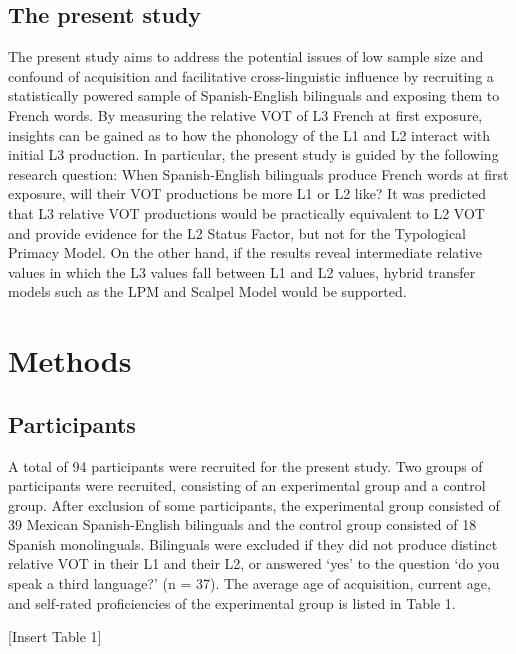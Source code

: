 \documentclass[
  english,
  man]{apa6}
\begin{document}
\hypertarget{the-present-study}{%
\subsection{The present study}\label{the-present-study}}

The present study aims to address the potential issues of low sample size and confound of acquisition and facilitative cross-linguistic influence by recruiting a statistically powered sample of Spanish-English bilinguals and exposing them to French words.
By measuring the relative VOT of L3 French at first exposure, insights can be gained as to how the phonology of the L1 and L2 interact with initial L3 production.
In particular, the present study is guided by the following research question: When Spanish-English bilinguals produce French words at first exposure, will their VOT productions be more L1 or L2 like?
It was predicted that L3 relative VOT productions would be practically equivalent to L2 VOT and provide evidence for the L2 Status Factor, but not for the Typological Primacy Model.
On the other hand, if the results reveal intermediate relative values in which the L3 values fall between L1 and L2 values, hybrid transfer models such as the LPM and Scalpel Model would be supported.

\hypertarget{methods}{%
\section{Methods}\label{methods}}

\hypertarget{participants}{%
\subsection{Participants}\label{participants}}

A total of 94 participants were recruited for the present study.
Two groups of participants were recruited, consisting of an experimental group and a control group. After exclusion of some participants, the experimental group consisted of 39 Mexican Spanish-English bilinguals and the control group consisted of 18 Spanish monolinguals.
Bilinguals were excluded if they did not produce distinct relative VOT in their L1 and their L2, or answered `yes' to the question `do you speak a third language?' (n = 37).
The average age of acquisition, current age, and self-rated proficiencies of the experimental group is listed in Table 1.

{[}Insert Table 1{]}
\end{document}
